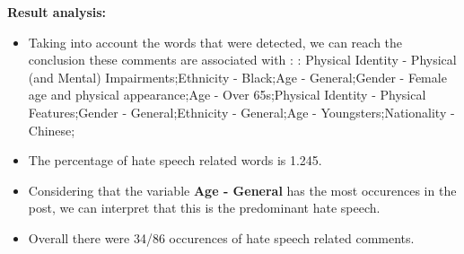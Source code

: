\documentclass[11pt]{article}
\begin{document}
\textbf{\Large Result analysis:}

\begin{itemize}\item Taking into account the words that were detected, we can reach the conclusion these comments are associated with : : Physical Identity - Physical (and Mental) Impairments;Ethnicity - Black;Age - General;Gender - Female age and physical appearance;Age - Over 65s;Physical Identity - Physical Features;Gender - General;Ethnicity - General;Age - Youngsters;Nationality - Chinese;%

\item The percentage of hate speech related words is 1.245.

\item Considering that the variable \textbf{Age - General} has the most occurences in the post, we can interpret that this is the predominant hate speech.

\item Overall there were 34/86 occurences of hate speech related comments.\end{itemize}
\end{document}
